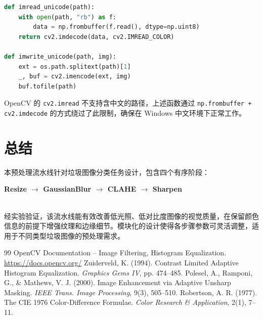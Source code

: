 \documentclass[12pt,a4paper]{ctexart}
\begin{document}
\begin{lstlisting}[language=Python, caption=中文路径读写]
def imread_unicode(path):
    with open(path, "rb") as f:
        data = np.frombuffer(f.read(), dtype=np.uint8)
    return cv2.imdecode(data, cv2.IMREAD_COLOR)

def imwrite_unicode(path, img):
    ext = os.path.splitext(path)[1]
    _, buf = cv2.imencode(ext, img)
    buf.tofile(path)
\end{lstlisting}

OpenCV 的 \texttt{cv2.imread} 不支持含中文的路径，上述函数通过 \texttt{np.frombuffer + cv2.imdecode} 的方式绕过了此限制，确保在 Windows 中文环境下正常工作。

\section{总结}

本预处理流水线针对垃圾图像分类任务设计，包含四个有序阶段：\\[4pt]
\centerline{\textbf{Resize $\rightarrow$ GaussianBlur $\rightarrow$ CLAHE $\rightarrow$ Sharpen}}\\[4pt]
经实验验证，该流水线能有效改善低光照、低对比度图像的视觉质量，在保留颜色信息的前提下增强纹理和边缘细节。模块化的设计使得各步骤参数可灵活调整，适用于不同类型垃圾图像的预处理需求。

\begin{thebibliography}{99}
 OpenCV Documentation -- Image Filtering, Histogram Equalization.
  \url{https://docs.opencv.org/}
 Zuiderveld, K. (1994). Contrast Limited Adaptive Histogram Equalization. \emph{Graphics Gems IV}, pp. 474--485.
 Polesel, A., Ramponi, G., \& Mathews, V. J. (2000). Image Enhancement via Adaptive Unsharp Masking. \emph{IEEE Trans. Image Processing}, 9(3), 505--510.
 Robertson, A. R. (1977). The CIE 1976 Color-Difference Formulae. \emph{Color Research \& Application}, 2(1), 7--11.
\end{thebibliography}
\end{document}
